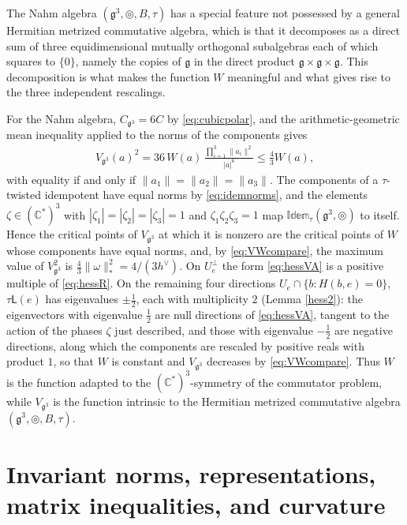 \documentclass [leqno, 10pt]{amsart}
\theoremstyle{definition}
\numberwithin{equation}{section}
\newcommand{\idem}{\mathbb{Idem}}
\newcommand{\tmlt}{\circledcirc}
\newcommand{\om}{\omega}
\newcommand{\lin}{\mathsf{L}}
\newcommand{\g}{\mathfrak{g}}
\newcommand{\com}{\mathbb C}
\newcommand{\hv}{h^\vee}
\newcommand{\norm}[1]{\lVert #1\rVert}
\newcommand{\nnorm}[1]{\lvert #1\rvert}%
\newcommand{\comass}[1]{\lVert #1\rVert_{\ast}}%
\newcommand{\Usp}{U}
\newcommand{\Uperp}{\Usp^{\perp}}
\begin{document}
The Nahm algebra $(\g^{3}, \tmlt, B, \tau)$ has a special feature not possessed by a general Hermitian metrized commutative algebra, which is that it decomposes as a direct sum of three equidimensional mutually orthogonal subalgebras each of which squares to $\{0\}$, namely the copies of $\g$ in the direct product $\g \times \g \times \g$. This decomposition is what makes the function $W$ meaningful and what gives rise to the three independent rescalings. 

For the Nahm algebra, $C_{\g^{3}} = 6C$ by \eqref{eq:cubicpolar}, and the arithmetic-geometric mean inequality applied to the norms of the components gives
\begin{align}\label{eq:VWcompare}
V_{\g^{3}}(a)^{2} = 36\,W(a)\,\frac{\prod_{i=1}^{3}\norm{a_{i}}^{2}}{\nnorm{a}^{6}} \leq \tfrac{4}{3}W(a),
\end{align}
with equality if and only if $\norm{a_{1}} = \norm{a_{2}} = \norm{a_{3}}$. The components of a $\tau$-twisted idempotent have equal norms by \eqref{eq:idemnorms}, and the elements $\zeta \in (\com^{\ast})^{3}$ with $|\zeta_{1}| = |\zeta_{2}| = |\zeta_{3}| = 1$ and $\zeta_{1}\zeta_{2}\zeta_{3} = 1$ map $\idem_{\tau}(\g^{3}, \tmlt)$ to itself. Hence the critical points of $V_{\g^{3}}$ at which it is nonzero are the critical points of $W$ whose components have equal norms, and, by \eqref{eq:VWcompare}, the maximum value of $V_{\g^{3}}^{2}$ is $\tfrac{4}{3}\comass{\om}^{2} = 4/(3\hv)$. On $\Uperp_{e}$ the form \eqref{eq:hessVA} is a positive multiple of \eqref{eq:hessR}. On the remaining four directions $\Usp_{e} \cap \{b: H(b, e) = 0\}$, $\tau\lin(e)$ has eigenvalues $\pm\tfrac{1}{2}$, each with multiplicity $2$ (Lemma \ref{hess2}): the eigenvectors with eigenvalue $\tfrac{1}{2}$ are null directions of \eqref{eq:hessVA}, tangent to the action of the phases $\zeta$ just described, and those with eigenvalue $-\tfrac{1}{2}$ are negative directions, along which the components are rescaled by positive reals with product $1$, so that $W$ is constant and $V_{\g^{3}}$ decreases by \eqref{eq:VWcompare}. Thus $W$ is the function adapted to the $(\com^{\ast})^{3}$-symmetry of the commutator problem, while $V_{\g^{3}}$ is the function intrinsic to the Hermitian metrized commutative algebra $(\g^{3}, \tmlt, B, \tau)$.

\section{Invariant norms, representations, matrix inequalities, and curvature}\label{sec:reductive}
\end{document}
